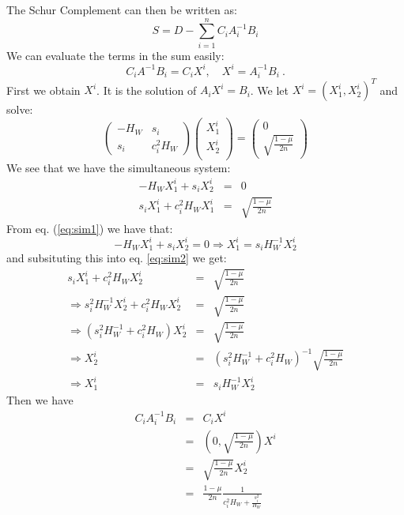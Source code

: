 \documentclass[12pt]{article}
\begin{document}
The Schur Complement can then be written as:
\begin{equation}
S = D - \sum_{i=1}^{n} C_{i} A_{i}^{-1} B_{i}
\end{equation}
We can evaluate the terms in the sum easily:
\begin{equation}
C_{i} A^{-1} B_{i} = C_{i} X^{i},\quad  X^{i} = A_{i}^{-1} B_{i} \ .
\end{equation}
First we obtain $X^{i}$. It is the solution of $A_{i} X^{i} = B_{i}$.
We let $X^{i} = \left( X_{1}^{i}, X_{2}^{i} \right)^T$ and solve:
\begin{equation}
\left( \begin{array}{cc} 
-H_W & s_i \\
 s_i & c_i^2 H_W 
\end{array} \right)
\left( \begin{array}{c}
X_1^i \\
X_2^i \\
\end{array} \right) = \left( \begin{array}{c} 
0 \\
\sqrt{\frac{1-\mu}{2n}} 
\end{array} \right)
\end{equation}
We see that we have the simultaneous system:
\begin{eqnarray}
-H_W X_1^i + s_i X_2^i &=& 0  \label{eq:sim1} \\
s_i X_1^i + c_i^2 H_W X_1^i &=& \sqrt{\frac{1-\mu}{2n}} \label{eq:sim2} 
\end{eqnarray}
From eq. (\ref{eq:sim1}) we have that:
\begin{equation} 
-H_W X_1^i + s_i X_2^i = 0  \Rightarrow X_1^i = s_i H_W^{-1} X_2^{i}
\end{equation}
and subsituting this into eq. \ref{eq:sim2} we get:
\begin{eqnarray}
 s_i X_1^i + c_i^2 H_W X_2^i &=&  \sqrt{\frac{1-\mu}{2n}} \\
\Rightarrow  s_i^2 H_W^{-1} X_2^{i} +  c_i^2 H_W X_2^i &=& \sqrt{\frac{1-\mu}{2n}} \\
\Rightarrow ( s_i^2 H_W^{-1} + c_i^2 H_W ) X_2^i &=& \sqrt{\frac{1-\mu}{2n}} \\
\Rightarrow X_2^{i} &=&  ( s_i^2 H_W^{-1} + c_i^2 H_W )^{-1} \sqrt{\frac{1-\mu}{2n}} \\
\Rightarrow X_1^i &=& s_i H_W^{-1} X_2^i
\end{eqnarray}
Then we have 
\begin{eqnarray}
C_i A_{i}^{-1} B_i &=& C_i X^{i} \\
               &=& ( 0, \sqrt{\frac{1-\mu}{2n}} ) X^{i} \\ 
               &=& \sqrt{\frac{1-\mu}{2n}} X_2^i \\
               &=& \frac{1-\mu}{2n} \frac{1}{c_i^2 H_W + \frac{\displaystyle s_i^2}{\displaystyle H_W} }
\end{eqnarray}
\end{document}
